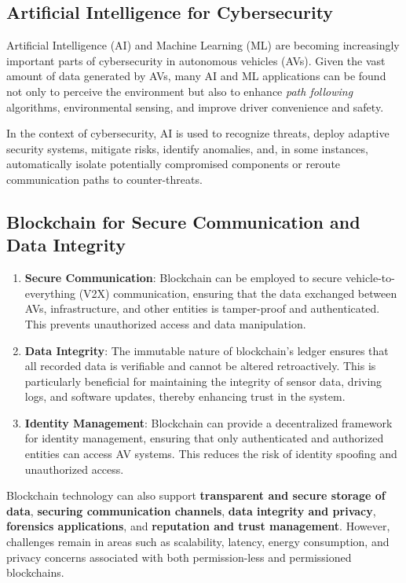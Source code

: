 \subsection{Artificial Intelligence for Cybersecurity}\label{subsec:artificial-intelligence-for-cybersecurity-in-avs}
Artificial Intelligence (AI) and Machine Learning (ML)
are becoming increasingly important parts of cybersecurity in autonomous vehicles (AVs).
Given the vast amount of data generated by AVs,
many AI and ML applications can be found not only to perceive the environment
but also to enhance \textit{path following} algorithms, environmental sensing,
and improve driver convenience and safety\cite{giannaros2023autonomous}.

In the context of cybersecurity, AI is used to recognize threats,
deploy adaptive security systems, mitigate risks, identify anomalies,
and, in some instances,
automatically isolate potentially compromised components
or reroute communication paths to counter-threats\cite{durlik2022cybersecurity}.

\subsection{Blockchain for Secure Communication and Data Integrity}\label{subsec:blockchain-for-secure-communication-and-data-integrity}

\begin{enumerate}
    \item \textbf{Secure Communication}: Blockchain can be employed to secure vehicle-to-everything (V2X) communication,
    ensuring that the data exchanged between AVs, infrastructure, and other entities is tamper-proof and authenticated.
    This prevents unauthorized access and data manipulation.
    \item \textbf{Data Integrity}: The immutable nature of blockchain’s ledger ensures that all recorded data is verifiable
    and cannot be altered retroactively.
    This is particularly beneficial for maintaining the integrity of sensor data, driving logs, and software updates,
    thereby enhancing trust in the system.
    \item \textbf{Identity Management}: Blockchain can provide a decentralized framework for identity management,
    ensuring that only authenticated and authorized entities can access AV systems.
    This reduces the risk of identity spoofing and unauthorized access.
\end{enumerate}

Blockchain technology can also support \textbf{transparent and secure storage of data},
\textbf{securing communication channels}, \textbf{data integrity and privacy},
\textbf{forensics applications}, and \textbf{reputation and trust management}.
However, challenges remain in areas such as scalability, latency, energy consumption,
and privacy concerns
associated with both permission-less and permissioned blockchains\cite{bendiab2023autonomous, giannaros2023autonomous, khan2020cyber, admass2023cyber, ahmad2023machine}.

